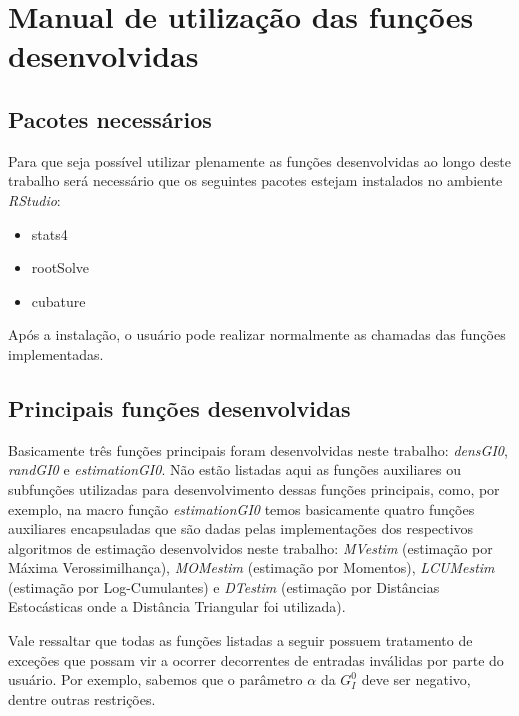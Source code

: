 \chapter{Manual de utilização das funções desenvolvidas} \label{apendiceA}

\section{Pacotes necessários}

Para que seja possível utilizar plenamente as funções desenvolvidas ao longo deste trabalho será necessário que os seguintes pacotes estejam instalados no ambiente \textit{RStudio}:

\begin{itemize}
    \item stats4
    \item rootSolve
    \item cubature
\end{itemize}

Após a instalação, o usuário pode realizar normalmente as chamadas das funções implementadas.

\section{Principais funções desenvolvidas}


Basicamente três funções principais foram desenvolvidas neste trabalho: \textit{densGI0}, \textit{randGI0} e \textit{estimationGI0}. Não estão listadas aqui as funções auxiliares ou subfunções utilizadas para desenvolvimento dessas funções principais, como, por exemplo, na macro função \textit{estimationGI0} temos basicamente quatro funções auxiliares encapsuladas que são dadas pelas implementações dos respectivos algoritmos de estimação desenvolvidos neste trabalho: \textit{MVestim} (estimação por Máxima Verossimilhança), \textit{MOMestim} (estimação por Momentos), \textit{LCUMestim} (estimação por Log-Cumulantes) e \textit{DTestim} (estimação por Distâncias Estocásticas onde a Distância Triangular foi utilizada).  

Vale ressaltar que todas as funções listadas a seguir possuem tratamento de exceções que possam vir a ocorrer decorrentes de entradas inválidas por parte do usuário. Por exemplo, sabemos que o parâmetro $\alpha$ da $G_I^0$ deve ser negativo, dentre outras restrições.

